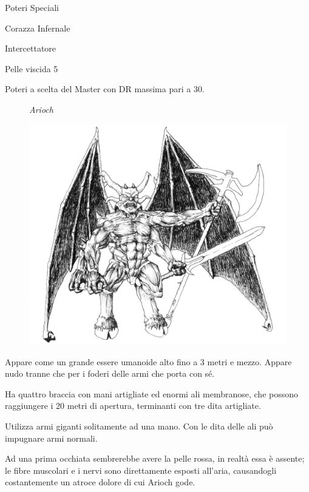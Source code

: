 \begin{parmostro}{Poteri Speciali} 
\item Corazza Infernale 
\item Intercettatore 
\item Pelle viscida 5
\item Poteri a scelta del Master con DR massima pari a 30.
\end{parmostro}

\begin{figure}[t]
\begin{center}
{\it Arioch}\par\bigskip
\includegraphics{arioch3.eps}
\end{center}
\end{figure}

 Appare come un grande
essere umanoide alto fino a 3 metri e mezzo. Appare nudo tranne che
per i foderi delle armi che porta con s\'e.

Ha quattro braccia con mani artigliate ed enormi ali membranose, che
possono raggiungere i 20 metri di apertura, terminanti con tre dita
artigliate.

Utilizza armi giganti solitamente ad una mano. Con le dita delle ali
pu\`o impugnare armi normali.


Ad una prima occhiata sembrerebbe avere la pelle rossa, in realt\`a
essa \`e assente; le fibre muscolari e i nervi sono direttamente
esposti all'aria, causandogli costantemente un atroce dolore di cui
Arioch gode.


